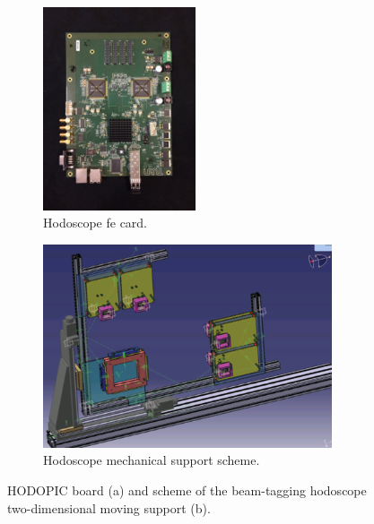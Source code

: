 \begin{figure}
\centering
\begin{subfigure}[t]{.34\textwidth}
\centering
\includegraphics[width=\linewidth, height = 6cm]{03_GraphicFiles/chapter3_CLaRySproto/Hodoscope/HodoCard1.jpg}
\caption{Hodoscope \gls{fe} card.}
\label{chap3::fig::HodoscopeFEcard}
\end{subfigure}
\begin{subfigure}[t]{.56\textwidth}
\centering
\includegraphics[width=\linewidth, trim = {0 0 1cm 0}, clip = true, height = 6cm]{03_GraphicFiles/chapter3_CLaRySproto/Hodoscope/HodoScheme.png}
\caption{Hodoscope mechanical support scheme.}
\label{chap3::fig::HodoscopeSchemeMech}
\end{subfigure}
\caption{HODOPIC board (a) and scheme of the beam-tagging hodoscope two-dimensional moving support (b).}
\label{chap3::fig::HodoPic}
\end{figure}

